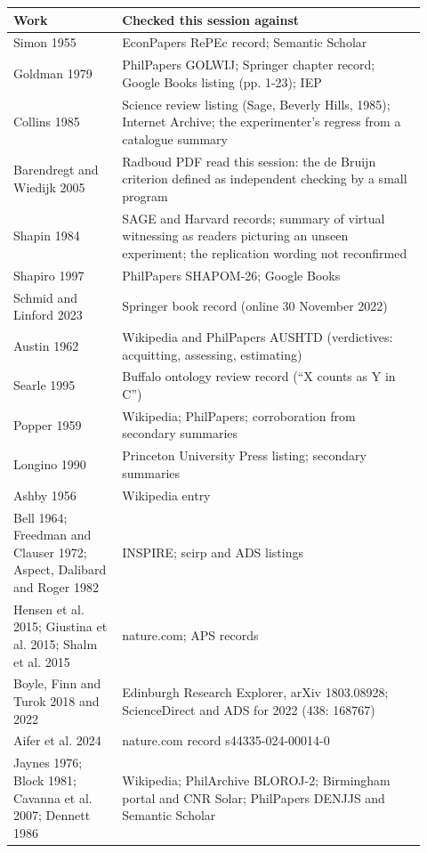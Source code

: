 \documentclass[11pt]{article}
\begin{document}
{\small\begin{longtable}{>{\raggedright\arraybackslash}p{0.242\linewidth}>{\raggedright\arraybackslash}p{0.678\linewidth}}
\toprule
\textbf{Work} & \textbf{Checked this session against} \\ \midrule\endhead
Simon 1955 & EconPapers RePEc record; Semantic Scholar \\
Goldman 1979 & PhilPapers GOLWIJ; Springer chapter record; Google Books listing (pp. 1-23); IEP \\
Collins 1985 & Science review listing (Sage, Beverly Hills, 1985); Internet Archive; the experimenter's regress from a catalogue summary \\
Barendregt and Wiedijk 2005 & Radboud PDF read this session: the de Bruijn criterion defined as independent checking by a small program \\
Shapin 1984 & SAGE and Harvard records; summary of virtual witnessing as readers picturing an unseen experiment; the replication wording not reconfirmed \\
Shapiro 1997 & PhilPapers SHAPOM-26; Google Books \\
Schmid and Linford 2023 & Springer book record (online 30 November 2022) \\
Austin 1962 & Wikipedia and PhilPapers AUSHTD (verdictives: acquitting, assessing, estimating) \\
Searle 1995 & Buffalo ontology review record (``X counts as Y in C'') \\
Popper 1959 & Wikipedia; PhilPapers; corroboration from secondary summaries \\
Longino 1990 & Princeton University Press listing; secondary summaries \\
Ashby 1956 & Wikipedia entry \\
Bell 1964; Freedman and Clauser 1972; Aspect, Dalibard and Roger 1982 & INSPIRE; scirp and ADS listings \\
Hensen et al. 2015; Giustina et al. 2015; Shalm et al. 2015 & nature.com; APS records \\
Boyle, Finn and Turok 2018 and 2022 & Edinburgh Research Explorer, arXiv 1803.08928; ScienceDirect and ADS for 2022 (438: 168767) \\
Aifer et al. 2024 & nature.com record s44335-024-00014-0 \\
Jaynes 1976; Block 1981; Cavanna et al. 2007; Dennett 1986 & Wikipedia; PhilArchive BLOROJ-2; Birmingham portal and CNR Solar; PhilPapers DENJJS and Semantic Scholar \\

\end{longtable}}
\end{document}
